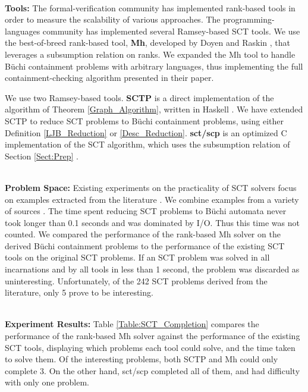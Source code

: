 \documentclass{LMCS}
\newcommand{\standout}[1]{\noindent \\ \textbf{#1}}
\newcommand\hide[1]{}
\newcommand\buchi{B\"uchi }
\begin{document}
\standout{Tools:} The formal-verification community has implemented rank-based
tools in order to measure the scalability of various approaches.  The
programming-languages community has implemented several Ramsey-based SCT 
tools. We use the best-of-breed rank-based tool, \textbf{Mh},
developed by Doyen and Raskin \cite{DR07}, that leverages a subsumption relation
on ranks.  We expanded the Mh tool to handle \buchi containment problems with
arbitrary languages, thus implementing the full containment-checking algorithm
presented in their paper. 

We use two Ramsey-based tools. \textbf{SCTP} is a direct implementation of the
\LJB algorithm of Theorem \ref{Graph_Algorithm}, written in Haskell
\cite{Fred01}.  We have extended SCTP to reduce SCT problems to \buchi
containment problems, using either Definition \ref{LJB_Reduction} or
\ref{Desc_Reduction}. \textbf{sct/scp} is an optimized C implementation of the
SCT algorithm, which uses the subsumption relation of Section \ref{Sect:Prep}
\cite{BL07}. 

\standout{Problem Space:} Existing experiments on the practicality of SCT
solvers focus on examples extracted from the literature \cite{BL07}.  We combine
examples from a variety of sources
\cite{Daedalus,BL07,Fred01,Glen99,LJB01,SJ05,Wahl00}. The time spent reducing
SCT problems to \buchi automata never took longer than 0.1 seconds and was
dominated by I/O.  Thus this time was not counted\hide{Experimenting reveals
a statistically insignificant \emph{slowdown} when reading the SCT problem and
performing the reduction.}. We compared the performance of the rank-based Mh
solver on the derived \buchi containment problems to the performance of the
existing SCT tools on the original SCT problems. If an SCT problem was solved in
all incarnations and by all tools in less than 1 second, the problem was
discarded as uninteresting.  Unfortunately, of the 242 SCT problems derived from
the literature, only 5 prove to be interesting.


\standout{Experiment Results:} Table \ref{Table:SCT_Completion} compares the performance
of the rank-based Mh solver against the performance of the existing SCT tools,
displaying which problems each tool could solve, and the time taken to solve
them. Of the interesting problems, both SCTP and Mh could only complete 3.
On the other hand, sct/scp completed all of them, and had difficulty with only
one problem. 
\end{document}
